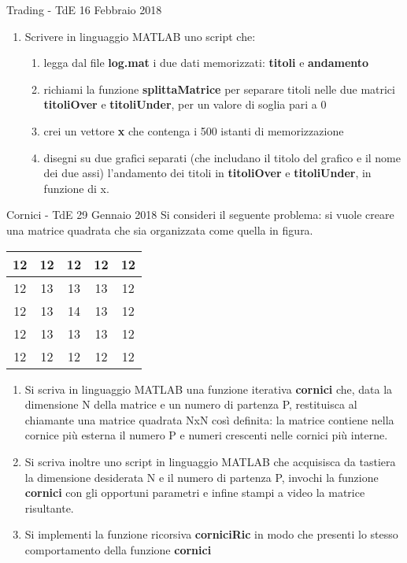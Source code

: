 \begin{frame}[allowframebreaks]{Trading - TdE 16 Febbraio 2018}
\begin{enumerate}
            \framebreak
        \item Scrivere in linguaggio MATLAB uno script che:
            \begin{enumerate}
                \item legga dal file \textbf{log.mat} i due dati memorizzati: \textbf{titoli} e \textbf{andamento}
                \item richiami la funzione \textbf{splittaMatrice} per separare titoli nelle due matrici \textbf{titoliOver} e \textbf{titoliUnder}, per un valore di soglia pari a 0
                \item crei un vettore \textbf{x} che contenga i 500 istanti di memorizzazione
                \item disegni su due grafici separati (che includano il titolo del grafico e il nome dei due assi) l’andamento dei titoli in \textbf{titoliOver} e \textbf{titoliUnder}, in funzione di x.
            \end{enumerate}
    \end{enumerate}
\end{frame}


\begin{frame}[allowframebreaks]{Cornici - TdE 29 Gennaio 2018}
    Si consideri il seguente problema: si vuole creare una matrice quadrata che sia organizzata come quella in figura.

    \begin{tabular}{|c|c|c|c|c|}
        \hline
        12 & 12 & 12 & 12 & 12 \\
        \hline
        12 & 13 & 13 & 13 & 12 \\
        \hline
        12 & 13 & 14 & 13 & 12 \\
        \hline
        12 & 13 & 13 & 13 & 12 \\
        \hline
        12 & 12 & 12 & 12 & 12 \\
        \hline
    \end{tabular}

    \begin{enumerate}
        \item Si scriva in linguaggio MATLAB una funzione \alert{iterativa} \textbf{cornici} che, data la dimensione N della matrice e un numero di partenza P, restituisca al chiamante una matrice quadrata NxN così definita: la matrice contiene nella cornice più esterna il numero P e numeri crescenti nelle cornici più interne.

        \item Si scriva inoltre uno script in linguaggio MATLAB che acquisisca da tastiera la dimensione desiderata N e il numero di partenza P, invochi la funzione \textbf{cornici} con gli opportuni parametri e infine stampi a video la matrice risultante.

        \item Si implementi la funzione \alert{ricorsiva} \textbf{corniciRic} in modo che presenti lo stesso comportamento della funzione \textbf{cornici}
    \end{enumerate}
\end{frame}

